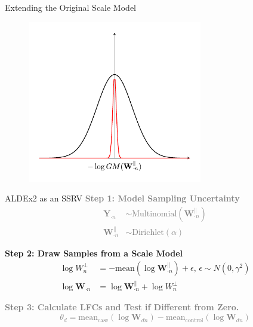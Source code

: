 \documentclass[
  ignorenonframetext,
]{beamer}
\begin{document}
\begin{frame}{Extending the Original Scale Model}
\protect\hypertarget{extending-the-original-scale-model}{}
\begin{figure}
  \centering
  \includegraphics[width=3in]{figures/scale-model-figure-2.pdf}
\end{figure}
\end{frame}

\begin{frame}{ALDEx2 as an SSRV}
\protect\hypertarget{aldex2-as-an-ssrv}{}
\textcolor{gray}{\textbf{Step 1: Model Sampling Uncertainty}}
\textcolor{gray}{\begin{align*}
\mathbf{Y}_{\cdot n} &\sim \text{Multinomial}(\mathbf{W}_{\cdot n}^\parallel)\\
\mathbf{W}_{\cdot n}^\parallel &\sim \text{Dirichlet}(\alpha)
\end{align*}}

\textbf{Step 2: Draw Samples from a Scale Model} \begin{align*}
\log W_{n}^\perp &=- \text{mean}(\log \mathbf{W}_{\cdot n}^\parallel) + \epsilon, \, \epsilon \sim N(0,\gamma^2)\\
\log \mathbf{W}_{\cdot n} &= \log \mathbf{W}_{\cdot n}^\parallel + \log W_{n}^\perp
\end{align*}

\textcolor{gray}{\textbf{Step 3: Calculate LFCs and Test if Different from Zero.}}
\textcolor{gray}{\begin{equation*}
\theta_d = \text{mean}_{\text{case}}(\log \mathbf{W}_{dn}) - \text{mean}_{\text{control}}(\log \mathbf{W}_{dn})
  \end{equation*}}
\end{frame}
\end{document}
